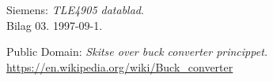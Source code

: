 \renewcommand{\bibname}{Litteraturliste}
\fancyhead[CE,CO]{}
\fancyfoot[CE,CO]{}
\begin{thebibliography}{2}


 Siemens: \textit{TLE4905 datablad}. \\
Bilag 03. 1997-09-1.

 Public Domain: \textit{Skitse over buck converter princippet.} \\
\url{https://en.wikipedia.org/wiki/Buck_converter}

\end{thebibliography}